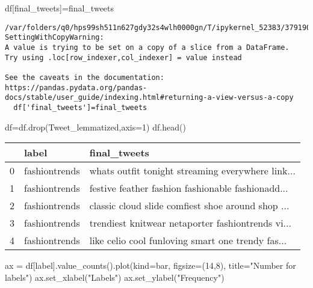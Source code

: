 \documentclass[
  letterpaper,
  DIV=11,
  numbers=noendperiod]{scrartcl}
\newenvironment{Shaded}{\begin{snugshade}}{\end{snugshade}}
\newcommand{\DecValTok}[1]{\textcolor[rgb]{0.68,0.00,0.00}{#1}}
\newcommand{\NormalTok}[1]{\textcolor[rgb]{0.00,0.23,0.31}{#1}}
\newcommand{\OperatorTok}[1]{\textcolor[rgb]{0.37,0.37,0.37}{#1}}
\newcommand{\StringTok}[1]{\textcolor[rgb]{0.13,0.47,0.30}{#1}}
\begin{document}
\begin{Shaded}
\begin{Highlighting}[]
\NormalTok{df[}\StringTok{\textquotesingle{}final\_tweets\textquotesingle{}}\NormalTok{]}\OperatorTok{=}\NormalTok{final\_tweets}
\end{Highlighting}
\end{Shaded}

\begin{verbatim}
/var/folders/q0/hps99sh511n627gdy32s4wlh0000gn/T/ipykernel_52383/3791901592.py:1: SettingWithCopyWarning: 
A value is trying to be set on a copy of a slice from a DataFrame.
Try using .loc[row_indexer,col_indexer] = value instead

See the caveats in the documentation: https://pandas.pydata.org/pandas-docs/stable/user_guide/indexing.html#returning-a-view-versus-a-copy
  df['final_tweets']=final_tweets
\end{verbatim}

\begin{Shaded}
\begin{Highlighting}[]
\NormalTok{df}\OperatorTok{=}\NormalTok{df.drop(}\StringTok{\textquotesingle{}Tweet\_lemmatized\textquotesingle{}}\NormalTok{,axis}\OperatorTok{=}\DecValTok{1}\NormalTok{)}
\NormalTok{df.head()}
\end{Highlighting}
\end{Shaded}

\begin{longtable}[]{@{}lll@{}}
\toprule()
& label & final\_tweets \\
\midrule()
\endhead
0 & fashiontrends & whats outfit tonight streaming everywhere link... \\
1 & fashiontrends & festive feather fashion fashionable fashionadd... \\
2 & fashiontrends & classic cloud slide comfiest shoe around shop ... \\
3 & fashiontrends & trendiest knitwear netaporter fashiontrends vi... \\
4 & fashiontrends & like celio cool funloving smart one trendy fas... \\
\bottomrule()
\end{longtable}

\begin{Shaded}
\begin{Highlighting}[]
\NormalTok{ax }\OperatorTok{=}\NormalTok{ df[}\StringTok{\textquotesingle{}label\textquotesingle{}}\NormalTok{].value\_counts().plot(kind}\OperatorTok{=}\StringTok{\textquotesingle{}bar\textquotesingle{}}\NormalTok{,}
\NormalTok{                                    figsize}\OperatorTok{=}\NormalTok{(}\DecValTok{14}\NormalTok{,}\DecValTok{8}\NormalTok{),}
\NormalTok{                                    title}\OperatorTok{=}\StringTok{"Number for labels"}\NormalTok{)}
\NormalTok{ax.set\_xlabel(}\StringTok{"Labels"}\NormalTok{)}
\NormalTok{ax.set\_ylabel(}\StringTok{"Frequency"}\NormalTok{)}
\end{Highlighting}
\end{Shaded}
\end{document}
